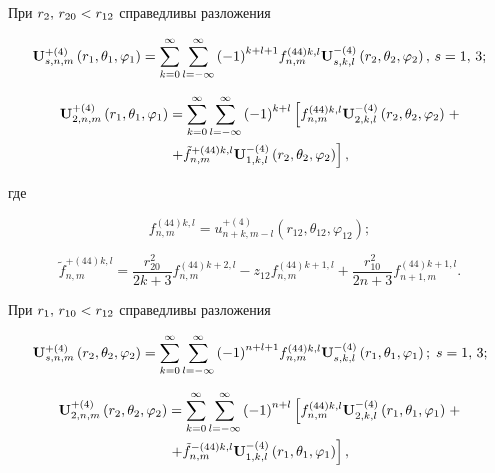 \begin{theorem}
При ${r_2},{\mkern 1mu} {\kern 1pt} {r_{20}} < {r_{12}}$ справедливы разложения

\begin{equation}\label{eq:1:95}
{\bf{U}}_{s,n,m}^{ + (4)}\left( {{r_1},{\theta _1},{\varphi _1}} \right) = \sum\limits_{k = 0}^\infty  {\sum\limits_{l =  - \infty }^\infty  {{{( - 1)}^{k + l + 1}}} } f_{n,m}^{(44)k,l}{\bf{U}}_{s,k,l}^{ - (4)}\left( {{r_2},{\theta _2},{\varphi _2}} \right), \, s = 1,\,3;
\end{equation}

\begin{multline}\label{eq:1:96}
{\bf{U}}_{2,n,m}^{ + (4)}\left( {{r_1},{\theta _1},{\varphi _1}} \right) = \sum\limits_{k = 0}^\infty  {\sum\limits_{l =  - \infty }^\infty  {{{( - 1)}^{k + l}}} } \left[ {f_{n,m}^{(44)k,l}{\bf{U}}_{2,k,l}^{ - (4)}\left( {{r_2},{\theta _2},{\varphi _2}} \right)} \right. + \\
\left. { + \tilde f_{n,m}^{ + (44)k,l}{\bf{U}}_{1,k,l}^{ - (4)}\left( {{r_2},{\theta _2},{\varphi _2}} \right)} \right],
\end{multline}

\noindent где

\begin{equation}\label{eq:1:97}
f_{n,m}^{(44)k,l} = u_{n + k,m - l}^{ + (4)}\left( {{r_{12}},{\theta _{12}},{\varphi _{12}}} \right);
\end{equation}

\begin{equation}\label{eq:1:98}
\tilde f_{n,m}^{ + (44)k,l} = \frac{{r_{20}^2}}{{2k + 3}}f_{n,m}^{(44)k + 2,l} - {z_{12}}f_{n,m}^{(44)k + 1,l} + \frac{{r_{10}^2}}{{2n + 3}}f_{n + 1,m}^{(44)k + 1,l}.
\end{equation}

При ${r_1},{\mkern 1mu} {\kern 1pt} {r_{10}} < {r_{12}}$ справедливы разложения

\begin{equation}\label{eq:1:99}
{\bf{U}}_{s,n,m}^{ + (4)}\left( {{r_2},{\theta _2},{\varphi _2}} \right) = \sum\limits_{k = 0}^\infty  {\sum\limits_{l =  - \infty }^\infty  {{{( - 1)}^{n + l + 1}}} } f_{n,m}^{(44)k,l}{\bf{U}}_{s,k,l}^{ - (4)}\left( {{r_1},{\theta _1},{\varphi _1}} \right); \, {\kern 1pt} s = 1,{\mkern 1mu} {\kern 1pt} 3;
\end{equation}

\begin{multline}\label{eq:1:100}
{\bf{U}}_{2,n,m}^{ + (4)}\left( {{r_2},{\theta _2},{\varphi _2}} \right) = \sum\limits_{k = 0}^\infty  {\sum\limits_{l =  - \infty }^\infty  {{{( - 1)}^{n + l}}} } \left[ {f_{n,m}^{(44)k,l}{\bf{U}}_{2,k,l}^{ - (4)}\left( {{r_1},{\theta _1},{\varphi _1}} \right)} \right. + \\
\left. { + \tilde f_{n,m}^{ - (44)k,l}{\bf{U}}_{1,k,l}^{ - (4)}\left( {{r_1},{\theta _1},{\varphi _1}} \right)} \right],
\end{multline}


\end{theorem}
